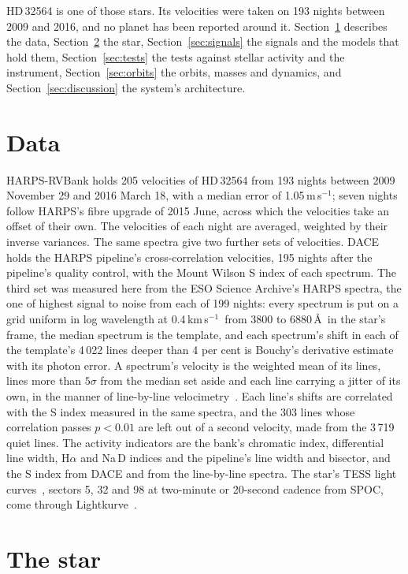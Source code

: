 \documentclass[3p,11pt]{elsarticle}
\newcommand{\kms}{km\,s$^{-1}$}
\newcommand{\ms}{m\,s$^{-1}$}
\begin{document}
HD\,32564 is one of those stars. Its velocities were taken on 193 nights between 2009 and 2016, and no
planet has been reported around it. Section~\ref{sec:data} describes the data,
Section~\ref{sec:star} the star, Section~\ref{sec:signals} the signals and the models that hold them,
Section~\ref{sec:tests} the tests against stellar activity and the instrument,
Section~\ref{sec:orbits} the orbits, masses and dynamics, and Section~\ref{sec:discussion} the
system's architecture.

\section{Data}\label{sec:data}

HARPS-RVBank holds 205 velocities of HD\,32564 from 193 nights between 2009 November 29 and 2016
March 18, with a median error of 1.05\,\ms; seven nights follow HARPS's fibre upgrade of 2015 June,
across which the velocities take an offset of their own. The velocities of each night are averaged,
weighted by their inverse variances. The same spectra give two further sets of velocities. DACE holds
the HARPS pipeline's cross-correlation velocities, 195 nights after the pipeline's quality control,
with the Mount Wilson S index of each spectrum. The third set was measured here from the ESO Science
Archive's HARPS spectra, the one of highest signal to noise from each of 199 nights: every spectrum is
put on a grid uniform in log wavelength at 0.4\,\kms\ from 3800 to 6880\,\AA\ in the star's frame,
the median spectrum is the template, and each spectrum's shift in each of the template's 4\,022 lines
deeper than 4 per cent is Bouchy's derivative estimate~\cite{Bouchy2001} with its photon error. A
spectrum's velocity is the weighted mean of its lines, lines more than $5\sigma$ from the median set
aside and each line carrying a jitter of its own, in the manner of line-by-line
velocimetry~\cite{Artigau2022}. Each line's shifts are correlated with the S index measured in the same
spectra, and the 303 lines whose correlation passes $p < 0.01$ are left out of a second velocity, made
from the 3\,719 quiet lines. The activity indicators are the bank's chromatic index, differential line width,
H$\alpha$ and Na\,D indices and the pipeline's line width and bisector, and the S index from DACE and
from the line-by-line spectra. The star's TESS light
curves~\cite{Ricker2015}, sectors 5, 32 and 98 at two-minute or 20-second cadence from SPOC, come
through Lightkurve~\cite{Lightkurve2018}.

\section{The star}\label{sec:star}
\end{document}
